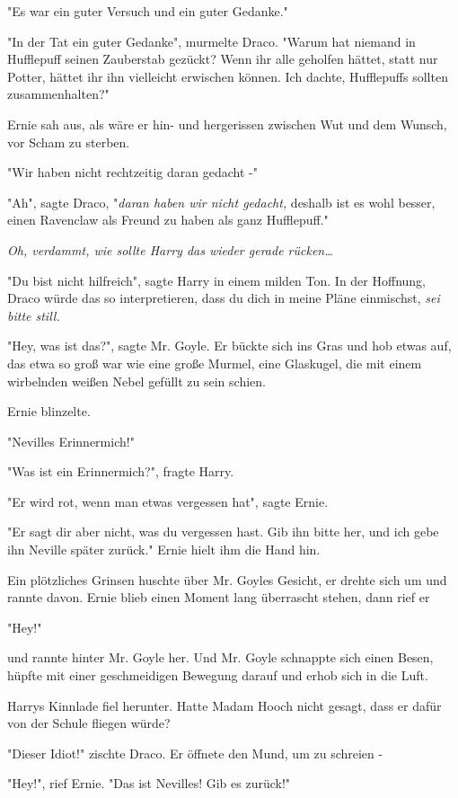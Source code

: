 {"Es war ein guter Versuch und ein guter Gedanke."

"In der Tat ein guter Gedanke", murmelte Draco. "Warum hat niemand in Hufflepuff seinen Zauberstab gezückt? Wenn ihr alle geholfen hättet, statt nur Potter, hättet ihr ihn vielleicht erwischen können. Ich dachte, Hufflepuffs sollten zusammenhalten?"

Ernie sah aus, als wäre er hin- und hergerissen zwischen Wut und dem Wunsch, vor Scham zu sterben.

"Wir haben nicht rechtzeitig daran gedacht -"

"Ah", sagte Draco, "\emph{daran haben wir nicht gedacht,} deshalb ist es wohl besser, einen Ravenclaw als Freund zu haben als ganz Hufflepuff."

\emph{Oh, verdammt, wie sollte Harry das wieder gerade rücken…}

"Du bist nicht hilfreich", sagte Harry in einem milden Ton. In der Hoffnung, Draco würde das so interpretieren, dass du dich in meine Pläne einmischst, \emph{sei bitte still.}

"Hey, was ist das?", sagte Mr. Goyle. Er bückte sich ins Gras und hob etwas auf, das etwa so groß war wie eine große Murmel, eine Glaskugel, die mit einem wirbelnden weißen Nebel gefüllt zu sein schien.

Ernie blinzelte.

"Nevilles Erinnermich!"

"Was ist ein Erinnermich?", fragte Harry.

"Er wird rot, wenn man etwas vergessen hat", sagte Ernie.

"Er sagt dir aber nicht, was du vergessen hast. Gib ihn bitte her, und ich gebe ihn Neville später zurück." Ernie hielt ihm die Hand hin.

Ein plötzliches Grinsen huschte über Mr. Goyles Gesicht, er drehte sich um und rannte davon. Ernie blieb einen Moment lang überrascht stehen, dann rief er

"Hey!"

und rannte hinter Mr. Goyle her. Und Mr. Goyle schnappte sich einen Besen, hüpfte mit einer geschmeidigen Bewegung darauf und erhob sich in die Luft.

Harrys Kinnlade fiel herunter. Hatte Madam Hooch nicht gesagt, dass er dafür von der Schule fliegen würde?

"Dieser Idiot!" zischte Draco. Er öffnete den Mund, um zu schreien -

"Hey!", rief Ernie. "Das ist Nevilles! Gib es zurück!"

}
